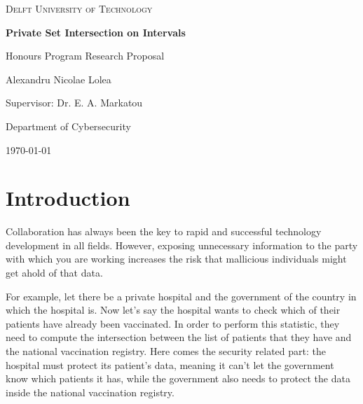 \documentclass{article}
\begin{document}
  \begin{titlepage}
    \centering
    
    {\scshape\LARGE Delft University of Technology\par}
    \vspace{1.5cm}
    
    {\huge\bfseries Private Set Intersection on Intervals\par}
    \vspace{0.5cm}
    
    {\Large Honours Program Research Proposal\par}
    \vspace{2cm}
    
    {\Large Alexandru Nicolae Lolea\par}
    \vfill
    
    Supervisor: Dr. E. A. Markatou\par
    Department of Cybersecurity\par
    \vspace{1.5cm}
    
    {\large \today\par}
\end{titlepage}

\section{Introduction}
Collaboration has always been the key to rapid and successful technology development in all fields. However, exposing unnecessary information to the party with which you are working increases the risk that mallicious individuals might get ahold of that data.

\vspace{1em} 

For example, let there be a private hospital and the government of the country
in which the hospital is. Now let's say the hospital wants to check which of their patients
have already been vaccinated. In order to perform this statistic, they need to compute
the intersection between the list of patients that they have and the national vaccination registry.
Here comes the security related part: the hospital must protect its patient's data, meaning it can't
let the government know which patients it has, while the government also needs to protect the data inside the national vaccination registry.
\end{document}
